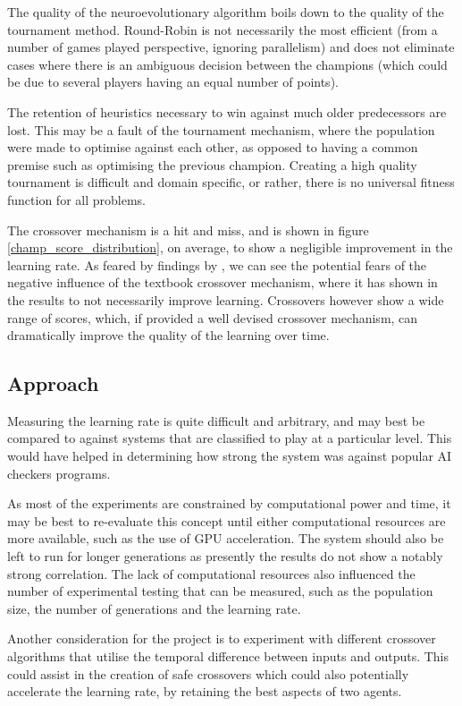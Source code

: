 \documentclass[12pt,a4paper]{article}
\begin{document}
    The quality of the neuroevolutionary algorithm boils down to the quality of the tournament method. Round-Robin is not necessarily the most efficient (from a number of games played perspective, ignoring  parallelism) and does not eliminate cases where there is an ambiguous decision between the champions (which could be due to several players having an equal number of points). 

    The retention of heuristics necessary to win against much older predecessors are lost. This may be a fault of the tournament mechanism, where the population were made to optimise against each other, as opposed to having a common premise such as optimising the previous champion. Creating a high quality tournament is difficult and domain specific, or rather, there is no universal fitness function for all problems.
   
    The crossover mechanism is a hit and miss, and is shown in figure \ref{champ_score_distribution}, on average, to show a negligible improvement in the learning rate. As feared by findings by \cite{emmanouilidis_comparison_2000}, we can see the potential fears of the negative influence of the textbook crossover mechanism, where it has shown in the results to not necessarily improve learning. Crossovers however show a wide range of scores, which, if provided a well devised crossover mechanism, can dramatically improve the quality of the learning over time.

    \subsection{Approach}
        Measuring the learning rate is quite difficult and arbitrary, and may best be compared to against systems that are classified to play at a particular level. This would have helped in determining how strong the system was against popular AI checkers programs. 

        As most of the experiments are constrained by computational power and time, it may be best to re-evaluate this concept until either computational resources are more available, such as the use of GPU acceleration. The system should also be left to run for longer generations as presently the results do not show a notably strong correlation. The lack of computational resources also influenced the number of experimental testing that can be measured, such as the population size, the number of generations and the learning rate. 
        
        Another consideration for the project is to experiment with different crossover algorithms that utilise the temporal difference between inputs and outputs. This could assist in the creation of safe crossovers which could also potentially accelerate the learning rate, by retaining the best aspects of two agents.
        
\end{document}
